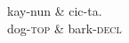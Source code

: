 \documentclass[a4paper]{article}
\begin{document}
\begin{dependency}
\begin{deptext}
kay-nun \& cic-ta. \\
dog-\textsc{top} \& bark-\textsc{decl} \\
\end{deptext}
\end{dependency}
\end{document}
